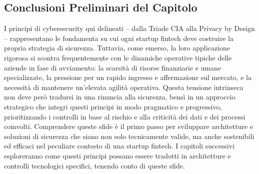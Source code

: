 \subsection{Conclusioni Preliminari del Capitolo}
I principi di cybersecurity qui delineati – dalla Triade CIA alla Privacy by Design – rappresentano le fondamenta su cui ogni startup fintech deve costruire la propria strategia di sicurezza. Tuttavia, come emerso, la loro applicazione rigorosa si scontra frequentemente con le dinamiche operative tipiche delle aziende in fase di avviamento: la scarsità di risorse finanziarie e umane specializzate, la pressione per un rapido ingresso e affermazione sul mercato, e la necessità di mantenere un'elevata agilità operativa.
Questa tensione intrinseca non deve però tradursi in una rinuncia alla sicurezza, bensì in un approccio strategico che integri questi principi in modo pragmatico e progressivo, prioritizzando i controlli in base al rischio e alla criticità dei dati e dei processi coinvolti. Comprendere queste sfide è il primo passo per sviluppare architetture e soluzioni di sicurezza che siano non solo tecnicamente valide, ma anche sostenibili ed efficaci nel peculiare contesto di una startup fintech. I capitoli successivi esploreranno come questi principi possano essere tradotti in architetture e controlli tecnologici specifici, tenendo conto di queste sfide.